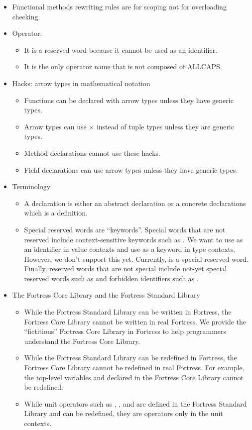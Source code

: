 \begin{itemize}
\item Functional methods rewriting rules are for scoping
not for overloading checking.

\item Operator: 
  \begin{itemize}
  \item It is a reserved word because it cannot be used as an identifier.
  \item It is the only operator name that is not composed of ALLCAPS.
  \end{itemize}

\item Hacks: arrow types in mathematical notation
  \begin{itemize}
  \item Functions can be declared with arrow types unless they have
  generic types.
  \item Arrow types can use $\times$ instead of tuple types unless they are
  generic types.
  \item Method declarations cannot use these hacks.
  \item Field declarations can use arrow types unless they have generic
  types.
  \end{itemize}

\item Terminology
  \begin{itemize}
  \item A declaration is either an abstract declaration or a concrete
  declarations which is a definition.
  \item Special reserved words are ``keywords''.  Special words that are
  not reserved include context-sensitive keywords such as .  We
  want to use  as an identifier in value contexts and use
   as a keyword in type contexts.  However, we don't support this
  yet.  Currently,  is a special reserved word.  Finally,
  reserved words that are not special include not-yet special reserved
  words such as  and forbidden identifiers such as
  .
  \end{itemize}

\item The Fortress Core Library and the Fortress Standard Library
  \begin{itemize}
  \item While the Fortress Standard Library can be written in Fortress, the
  Fortress Core Library cannot be written in real Fortress.  We provide the
  ``fictitious'' Fortress Core Library in Fortress to help programmers
  understand the Fortress Core Library.
  \item While the Fortress Standard Library can be redefined in Fortress, the
  Fortress Core Library cannot be redefined in real Fortress.
  For example, the top-level variables  and  declared in
  the Fortress Core Library cannot be redefined.
  \item While unit operators such as , , and
   are defined in the Fortress Standard Library and can be
  redefined, they are operators only in the unit contexts.
  \end{itemize}


\end{itemize}
